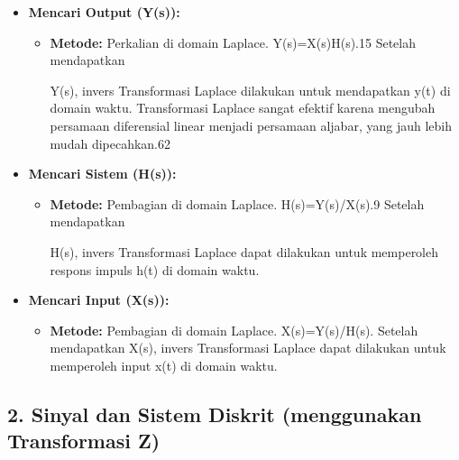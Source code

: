 \documentclass[
  letterpaper,
  DIV=11,
  numbers=noendperiod]{scrreprt}
\providecommand{\tightlist}{%
  \setlength{\itemsep}{0pt}\setlength{\parskip}{0pt}}\usepackage{longtable,booktabs,array}
\begin{document}
\begin{itemize}
\item
  \textbf{Mencari Output (Y(s)):}

  \begin{itemize}
  \item
    \textbf{Metode:} Perkalian di domain Laplace. Y(s)=X(s)H(s).15
    Setelah mendapatkan

    Y(s), invers Transformasi Laplace dilakukan untuk mendapatkan y(t)
    di domain waktu. Transformasi Laplace sangat efektif karena mengubah
    persamaan diferensial linear menjadi persamaan aljabar, yang jauh
    lebih mudah dipecahkan.62
  \end{itemize}
\item
  \textbf{Mencari Sistem (H(s)):}

  \begin{itemize}
  \item
    \textbf{Metode:} Pembagian di domain Laplace. H(s)=Y(s)/X(s).9
    Setelah mendapatkan

    H(s), invers Transformasi Laplace dapat dilakukan untuk memperoleh
    respons impuls h(t) di domain waktu.
  \end{itemize}
\item
  \textbf{Mencari Input (X(s)):}

  \begin{itemize}
  \tightlist
  \item
    \textbf{Metode:} Pembagian di domain Laplace. X(s)=Y(s)/H(s).
    Setelah mendapatkan X(s), invers Transformasi Laplace dapat
    dilakukan untuk memperoleh input x(t) di domain waktu.
  \end{itemize}
\end{itemize}

\subsection{2. Sinyal dan Sistem Diskrit (menggunakan Transformasi
Z)}\label{sinyal-dan-sistem-diskrit-menggunakan-transformasi-z}
\end{document}
